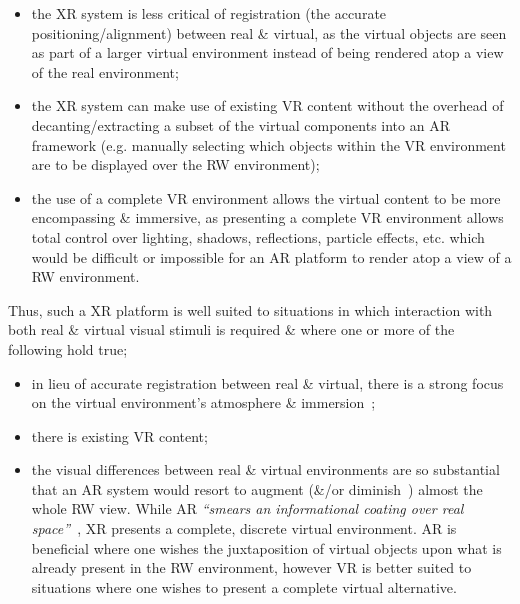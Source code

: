 \begin{itemize}
	\item the XR system is less critical of registration (the accurate positioning/alignment) between real \& virtual, as the virtual objects are seen as part of a larger virtual environment instead of being rendered atop a view of the real environment;
	\item the XR system can make use of existing VR content without the overhead of decanting/extracting a subset of the virtual components into an AR framework (e.g. manually selecting which objects within the VR environment are to be displayed over the RW environment);
	\item the use of a complete VR environment allows the virtual content to be more encompassing \& immersive, as presenting a complete VR environment allows total control over lighting, shadows, reflections, particle effects, etc. which would be difficult or impossible for an AR platform to render atop a view of a RW environment.
\end{itemize}

Thus, such a XR platform is well suited to situations in which interaction with both real \& virtual visual stimuli is required \& where one or more of the following hold true;

\begin{itemize}
	\item in lieu of accurate registration between real \& virtual, there is a strong focus on the virtual environment's atmosphere \& immersion~\cite{deamicis:gamebased};
	\item there is existing VR content;
	\item the visual differences between real \& virtual environments are so substantial that an AR system would resort to augment (\&/or diminish~\cite{Mann2002}) almost the whole RW view. While AR \textit{``smears an informational coating over real space''}~\cite{Andersen}, XR presents a complete, discrete virtual environment. AR is beneficial where one wishes the juxtaposition of virtual objects upon what is already present in the RW environment, however VR is better suited to situations where one wishes to present a complete virtual alternative.
\end{itemize}



